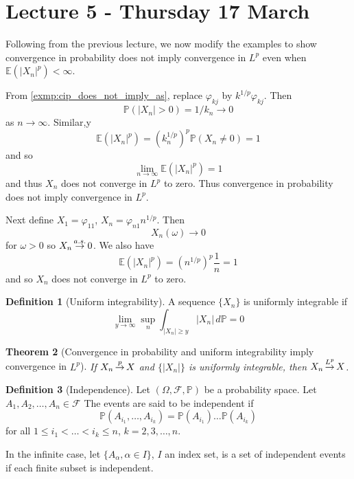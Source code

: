 \documentclass[10pt, oneside, reqno]{amsart}
\theoremstyle{plain}%
\newtheorem{thm}{Theorem}[section]
\theoremstyle{definition}
\newtheorem{defn}[thm]{Definition}
\theoremstyle{remark}
\renewcommand{\phi}{\varphi}
\newcommand{\sigf}{\mathcal{F}}
\newcommand{\E}{\mathbb{E}}
\renewcommand{\P}{\mathbb{P}}
\def\cip{\,{\buildrel p \over \rightarrow}\,}
\def\cas{\,{\buildrel a.s. \over \rightarrow}\,}
\def\clp{\,{\buildrel L^p \over \rightarrow}\,}
\begin{document}
\section{Lecture 5 - Thursday 17 March} %
\label{sec:lecture_5_thursday_17_march}

Following from the previous lecture, we now modify the examples to show convergence in probability does not imply convergence in $L^p$ even when $\E(|X_n|^p) < \infty$.

From \ref{exmp:cip_does_not_imply_as}, replace $\phi_{kj}$ by $k^{1/p} \phi_{kj}$.  Then \[
    \P(|X_n| > 0) = 1/{k_n} \rightarrow 0
\] as $n \rightarrow \infty$.  Similar,y \[
    \E(|X_n|^p) = (k_n^{1/p})^p \P(X_n \neq 0) = 1
\] and so \[
    \lim_{n \rightarrow \infty} \E(|X_n|^p) = 1
\] and thus $X_n$ does not converge in $L^p$ to zero.  Thus convergence in probability does not imply convergence in $L^p$.

Next define $X_1 = \phi_{11}$, $X_n = \phi_{n1}n^{1/p}$.  Then \[
    X_n(\omega) \rightarrow 0
\] for $\omega > 0$ so $X_n \cas 0$.  We also have \[
    \E(|X_n|^p) = (n^{1/p})^p \frac{1}{n} = 1 
\] and so $X_n$ does not converge in $L^p$ to zero.

\begin{defn}[Uniform integrability]
    A sequence $\{ X_n \}$ is uniformly integrable if \[
        \lim_{y \rightarrow \infty} \sup_{n} \int_{|X_n| \geq y} |X_n | \, d\P = 0
    \] 
    
\end{defn}


\begin{thm}[Convergence in probability and uniform integrability imply convergence in $L^p$]
    If $X_n \cip X$ and $\{ | X_n | \}$ is uniformly integrable, then $X_n \clp X$.
\end{thm}

\begin{defn}[Independence]
    Let $(\Omega, \sigf, \P)$ be a probability space.  Let $A_1, A_2, \dots, A_n \in \sigf$  The events are said to be independent if \[
        \P(A_{i_1}, \dots, A_{i_k}) = \P(A_{i_1}) \dots \P(A_{i_k})
    \] for all $1 \leq i_1 < \dots < i_k \leq n$, $k = 2, 3, \dots, n$.
    
    In the infinite case, let $\{A_{\alpha}, \alpha \in I \}$, $I$ an index set, is a set of independent events if each finite subset is independent.
    
\end{defn}
\end{document}
